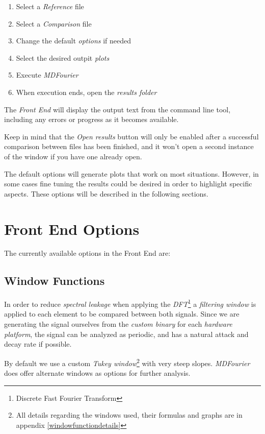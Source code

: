 \documentclass[10pt,a4paper]{report}
\begin{document}
\begin{enumerate}
	\item Select a \textit{Reference} file
	\item Select a \textit{Comparison} file
	\item Change the default \textit{options} if needed
	\item Select the desired outpit \textit{plots}
	\item Execute \textit{MDFourier}
	\item When execution ends, open the \textit{results folder}
\end{enumerate}

The \textit{Front End} will display the output text from the command line tool, including any errors or progress as it becomes available.

Keep in mind that the \textit{Open results} button will only be enabled after a successful comparison between files has been finished, and it won't open a second instance of the window if you have one already open.

The default options will generate plots that work on most situations. However, in some cases fine tuning the results could be desired in order to highlight specific aspects. These options will be described in the following sections.

\section{Front End Options}

The currently available options in the Front End are:

\subsection{Window Functions}
\label{windows}

In order to reduce \textit{spectral leakage} when applying the \textit{DFT}\footnote{Discrete Fast Fourier Transform} a \textit{filtering window} is applied to each element to be compared between both signals. Since we are generating the signal ourselves from the \textit{custom binary} for each \textit{hardware platform}, the signal can be analyzed as periodic, and has a natural attack and decay rate if possible.

By default we use a custom \textit{Tukey window}\footnote{ All details regarding the windows used, their formulas and graphs are in appendix \ref{windowfunctiondetails}} with very steep slopes. \textit{MDFourier} does offer alternate windows as options for further analysis.
\end{document}
